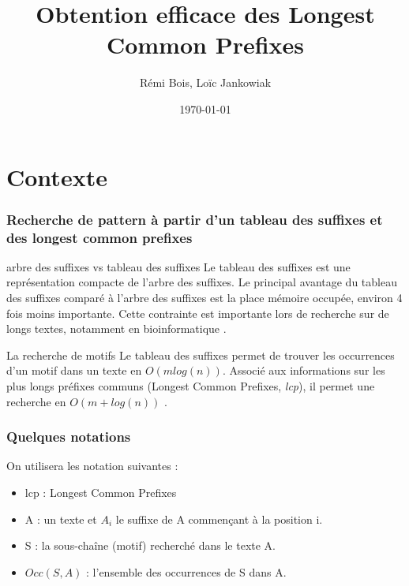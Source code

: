 \documentclass[10pt]{beamer}
\title{Obtention efficace des Longest Common Prefixes}
\author{Rémi Bois, Loïc Jankowiak}
\date{\today}
\begin{document}
\begin{frame}
  \maketitle

\end{frame}

\begin{frame}
  \tableofcontents
\end{frame}

\section{Contexte}
\label{sec:context}



\begin{frame}
  \frametitle{Recherche de pattern à partir d'un tableau des suffixes
    et des longest common prefixes}

  \begin{block}{arbre des suffixes vs tableau des suffixes} 
    Le tableau des suffixes est une représentation compacte de l'arbre
    des suffixes. Le principal avantage du tableau des suffixes comparé à
    l'arbre des suffixes est la place mémoire occupée, environ 4 fois
    moins importante. Cette contrainte est importante lors de
    recherche sur de longs textes, notamment en bioinformatique \cite{Raffinot11}.
  \end{block}

  \pause

  \begin{block}{La recherche de motifs}
    Le tableau des suffixes permet de trouver les occurrences d'un
    motif dans un texte en $O(m log(n))$. Associé aux informations sur
    les plus longs préfixes communs (Longest Common Prefixes,
    \emph{lcp}), il permet une recherche en $O(m + log(n))$ \cite{Manber93}.
  \end{block}
  
\end{frame}

\begin{frame}
  \frametitle{Quelques notations}
  On utilisera les notation suivantes :

  \begin{itemize}
  \item lcp : Longest Common Prefixes
  \item A : un texte et $A_i$ le suffixe de A commençant à la position i.
  \item S : la sous-chaîne (motif) recherché dans le texte A.
  \item $Occ(S, A)$ : l'ensemble des occurrences de S dans A.
  \end{itemize}
\end{frame}
\end{document}
